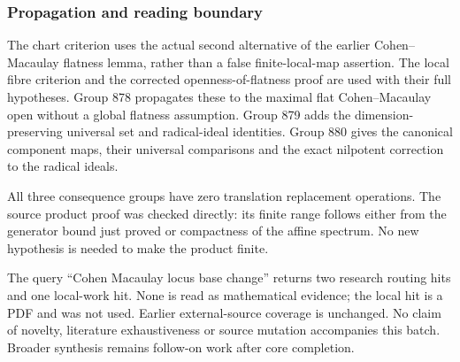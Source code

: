 \subsubsection{Propagation and reading boundary}\label{propagation-and-reading-boundary}

The chart criterion uses the actual second alternative of the earlier Cohen--Macaulay flatness lemma, rather than a false finite-local-map assertion. The local fibre criterion and the corrected openness-of-flatness proof are used with their full hypotheses. Group 878 propagates these to the maximal flat Cohen--Macaulay open without a global flatness assumption. Group 879 adds the dimension-preserving universal set and radical-ideal identities. Group 880 gives the canonical component maps, their universal comparisons and the exact nilpotent correction to the radical ideals.

All three consequence groups have zero translation replacement operations. The source product proof was checked directly: its finite range follows either from the generator bound just proved or compactness of the affine spectrum. No new hypothesis is needed to make the product finite.

The query ``Cohen Macaulay locus base change'' returns two research routing hits and one local-work hit. None is read as mathematical evidence; the local hit is a PDF and was not used. Earlier external-source coverage is unchanged. No claim of novelty, literature exhaustiveness or source mutation accompanies this batch. Broader synthesis remains follow-on work after core completion.
